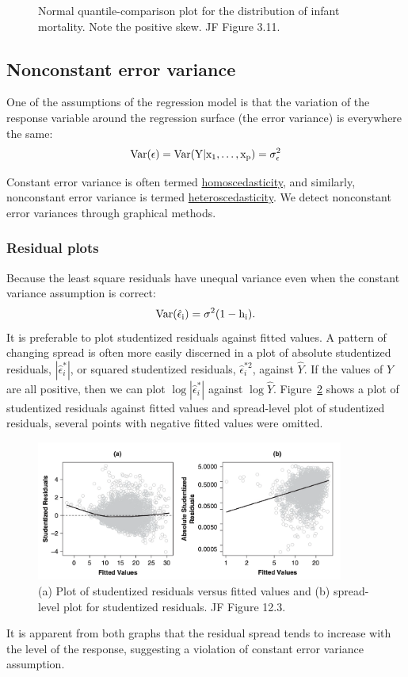 \begin{itemize}
\begin{figure}[H]
\begin{center}
		\caption{
			Normal quantile-comparison plot for the distribution of infant mortality.  Note the positive skew.
			JF Figure 3.11.}
		\label{fig:JF_3_11}
	\end{center}
\end{figure}
%  
\end{itemize}




\subsection*{Nonconstant error variance}
One of the assumptions of the regression model is that the variation of the response variable around the regression surface (the error variance) is everywhere the same:
$$
\rm Var(\epsilon) = \rm Var(Y | x_1, \dots, x_p) = \sigma_\epsilon^2
$$

Constant error variance is often termed \underline{homoscedasticity}, and similarly, nonconstant error variance is termed \underline{heteroscedasticity}.
We detect nonconstant error variances through graphical methods.

\subsubsection*{Residual plots}
Because the least square residuals have unequal variance even when the constant variance assumption is correct:
$$
\rm Var(\hat{\epsilon}_i) = \sigma^2 (1 - h_i).
$$
It is preferable to plot studentized residuals against fitted values.
A pattern of changing spread is often more easily discerned in a plot of absolute studentized residuals, $|\hat{\epsilon}_i^{*}|$, or squared studentized residuals, $\hat{\epsilon}_i^{*2}$, against $\hat{Y}$.
If the values of $\hat{Y}$ are all positive, then we can plot $\log |\hat{\epsilon}_i^{*}|$ against $\log \hat{Y}$.
Figure~\ref{fig:JF_12_3} shows a plot of studentized residuals against fitted values and spread-level plot of studentized residuals, several points with negative fitted values were omitted.
%
\begin{figure}[H]
\begin{center}
  \includegraphics[width=0.9\textwidth]{Lecture18/JF_12_3}
  \caption{(a) Plot of studentized residuals versus fitted values and (b) spread-level plot for studentized residuals.
   JF Figure 12.3.}
  \label{fig:JF_12_3}
\end{center}
\end{figure}
%
It is apparent from both graphs that the residual spread tends to increase with the level of the response, suggesting a violation of constant error variance assumption.

